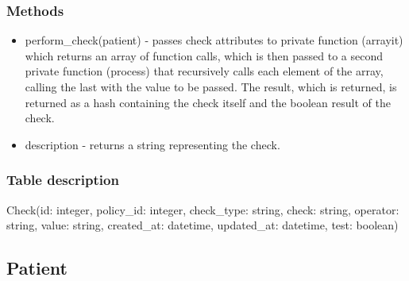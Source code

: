 \documentclass[letterpaper]{amsart}
\begin{document}
\subsubsection{Methods}
\begin{itemize}
    \item perform\_check(patient) - passes check attributes to private function (arrayit) which returns an array of function calls, which is then passed to a second private function (process) that recursively calls each element of the array, calling the last with the value to be passed.  The result, which is returned, is returned as a hash containing the check itself and the boolean result of the check. 
    \item description - returns a string representing the check.
\end{itemize}

\subsubsection{Table description}
Check(id: integer, policy\_id: integer, check\_type: string, check: string, operator: string, value: string, created\_at: datetime, updated\_at: datetime, test: boolean)

\subsection{Patient}
\end{document}

